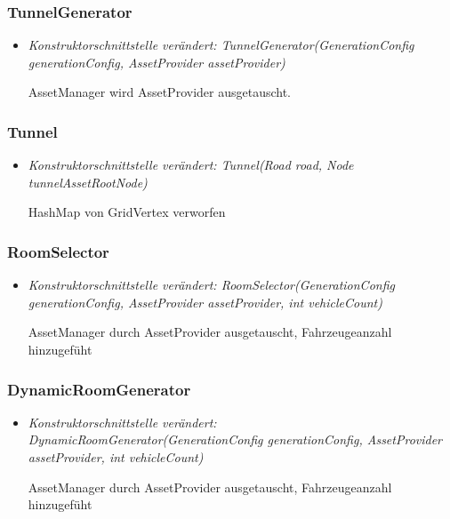 \subsubsection{TunnelGenerator}
\begin{itemize}
    \item \textit{Konstruktorschnittstelle verändert: TunnelGenerator(GenerationConfig generationConfig, AssetProvider assetProvider)}
        \begin{leftbar}[0.9\linewidth]
            AssetManager wird AssetProvider ausgetauscht.\par
        \end{leftbar}
\end{itemize}


\subsubsection{Tunnel}
\begin{itemize}
    \item \textit{Konstruktorschnittstelle verändert: Tunnel(Road road, Node tunnelAssetRootNode)}
        \begin{leftbar}[0.9\linewidth]
            HashMap von GridVertex verworfen\par
        \end{leftbar}
\end{itemize}

\subsubsection{RoomSelector}
\begin{itemize}
    \item \textit{Konstruktorschnittstelle verändert: RoomSelector(GenerationConfig generationConfig, AssetProvider assetProvider, int vehicleCount)}
        \begin{leftbar}[0.9\linewidth]
            AssetManager durch AssetProvider ausgetauscht, Fahrzeugeanzahl hinzugefüht\par
        \end{leftbar}
\end{itemize}


\subsubsection{DynamicRoomGenerator}
\begin{itemize}
    \item \textit{Konstruktorschnittstelle verändert: DynamicRoomGenerator(GenerationConfig generationConfig, AssetProvider assetProvider, int vehicleCount)}
        \begin{leftbar}[0.9\linewidth]
            AssetManager durch AssetProvider ausgetauscht, Fahrzeugeanzahl hinzugefüht\par
        \end{leftbar}
\end{itemize}


